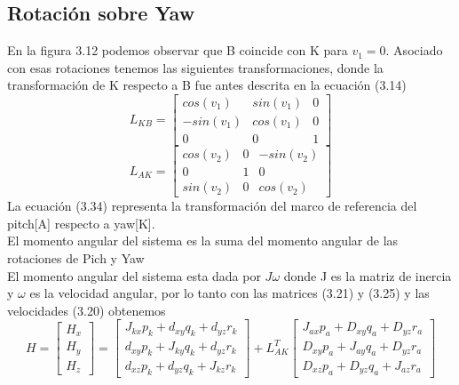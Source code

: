 \subsection{Rotación sobre Yaw}
En la figura 3.12 podemos observar que B coincide con K para $v_1 = 0$. Asociado con esas rotaciones
tenemos las siguientes transformaciones, donde la transformación de K respecto a B fue antes descrita en la ecuación (3.14)
\begin{equation}
	L_{KB} =
	\begin{bmatrix}
		cos(v_1)  & sin(v_1) & 0 \\
		-sin(v_1) & cos(v_1) & 0 \\
		0         & 0        & 1
	\end{bmatrix}
\end{equation}
\begin{equation}
	L_{AK} =
	\begin{bmatrix}
		cos(v_2) & 0 & -sin(v_2) \\
		0        & 1 & 0         \\
		sin(v_2) & 0 & cos(v_2)
	\end{bmatrix}
\end{equation}
La ecuación (3.34) representa la transformación del marco de referencia del pitch[A] respecto a yaw[K].\\
El momento angular del sistema es la suma del momento angular de las rotaciones
de Pich y Yaw \cite{Paper::Yoon2001}\\
El momento angular del sistema esta dada por $J\omega$ donde J es la matriz de inercia y $\omega$
es la velocidad angular, por lo tanto con las matrices (3.21) y (3.25) y las velocidades (3.20)
obtenemos
\begin{equation}
	H =
	\begin{bmatrix}
		H_x \\
		H_y \\
		H_z
	\end{bmatrix}
	=
	\begin{bmatrix}
		J_{kx}p_k + d_{xy}q_k + d_{yz}r_k \\
		d_{xy}p_k + J_{ky}q_k + d_{yz}r_k \\
		d_{xz}p_k + d_{yz}q_k + J_{kz}r_k
	\end{bmatrix}
	+L^T_{AK}
	\begin{bmatrix}
		J_{ax}p_a + D_{xy}q_a + D_{yz}r_a \\
		D_{xy}p_a + J_{ay}q_a + D_{yz}r_a \\
		D_{xz}p_a + D_{yz}q_a + J_{az}r_a
	\end{bmatrix}
\end{equation}
